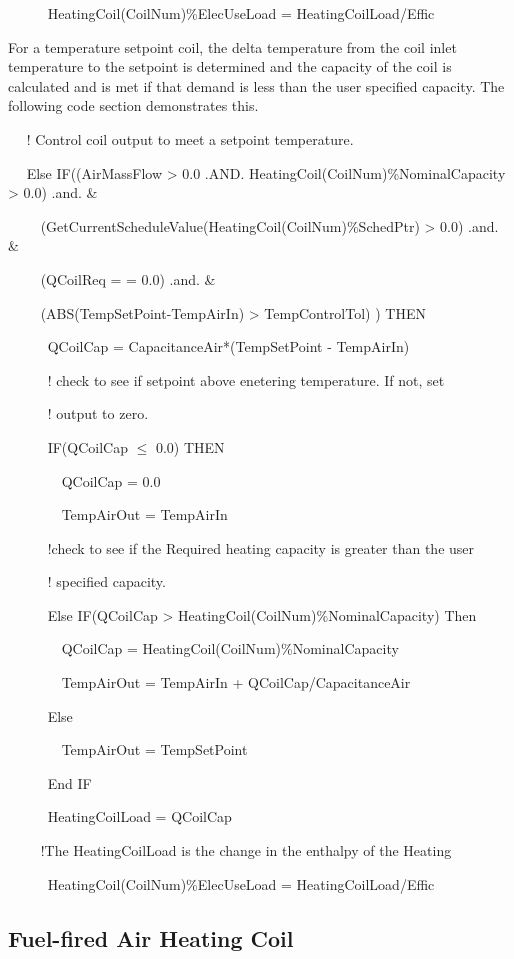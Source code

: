 ~~~~~ HeatingCoil(CoilNum)\%ElecUseLoad = HeatingCoilLoad/Effic

For a temperature setpoint coil, the delta temperature from the coil inlet temperature to the setpoint is determined and the capacity of the coil is calculated and is met if that demand is less than the user specified capacity.  The following code section demonstrates this.

~~ ! Control coil output to meet a setpoint temperature.

~~ Else IF((AirMassFlow \textgreater{} 0.0 .AND. HeatingCoil(CoilNum)\%NominalCapacity \textgreater{} 0.0) .and. \&

~~~~ (GetCurrentScheduleValue(HeatingCoil(CoilNum)\%SchedPtr) \textgreater{} 0.0) .and. \&

~~~~ (QCoilReq = = 0.0) .and. \&

~~~~ (ABS(TempSetPoint-TempAirIn) \textgreater{} TempControlTol) ) THEN

~~~~~ QCoilCap = CapacitanceAir*(TempSetPoint - TempAirIn)

~~~~~ ! check to see if setpoint above enetering temperature. If not, set

~~~~~ ! output to zero.

~~~~~ IF(QCoilCap \(\leq\) 0.0) THEN

~~~~~~~ QCoilCap = 0.0

~~~~~~~ TempAirOut = TempAirIn

~~~~~ !check to see if the Required heating capacity is greater than the user

~~~~~ ! specified capacity.

~~~~~ Else IF(QCoilCap \textgreater{} HeatingCoil(CoilNum)\%NominalCapacity) Then

~~~~~~~ QCoilCap = HeatingCoil(CoilNum)\%NominalCapacity

~~~~~~~ TempAirOut = TempAirIn + QCoilCap/CapacitanceAir

~~~~~ Else

~~~~~~~ TempAirOut = TempSetPoint

~~~~~ End IF

~~~~~ HeatingCoilLoad = QCoilCap

~~~~ !The HeatingCoilLoad is the change in the enthalpy of the Heating

~~~~~ HeatingCoil(CoilNum)\%ElecUseLoad = HeatingCoilLoad/Effic

\subsection{Fuel-fired Air Heating Coil}\label{gas-air-heating-coil}


